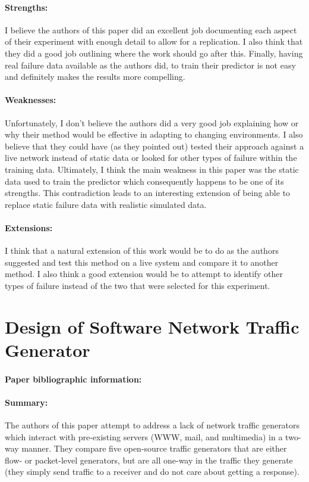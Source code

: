 \documentclass[11pt]{article}
\begin{document}
\paragraph{Strengths:}  I believe the authors of this paper did an excellent
job documenting each aspect of their experiment with enough detail to allow for
a replication.  I also think that they did a good job outlining where the work
should go after this.  Finally, having real failure data available as the
authors did, to train their predictor is not easy and definitely makes the
results more compelling.

\paragraph{Weaknesses:}  Unfortunately, I don't believe the authors did a very
good job explaining how or why their method would be effective in adapting to
changing environments.  I also believe that they could have (as they pointed
out) tested their approach against a live network instead of static data or
looked for other types of failure within the training data.  Ultimately, I
think the main weakness in this paper was the static data used to train the
predictor which consequently happens to be one of its strengths.  This
contradiction leads to an interesting extension of being able to replace static
failure data with realistic simulated data.

\paragraph{Extensions:}  I think that a natural extension of this work would be
to do as the authors suggested and test this method on a live system and
compare it to another method.  I also think a good extension would be to
attempt to identify other types of failure instead of the two that were
selected for this experiment.

\newpage
\section{Design of Software Network Traffic Generator}
\paragraph{Paper bibliographic information:}
\paragraph{Summary:}  The authors of this paper attempt to address a lack of network traffic generators which interact with pre-existing servers (WWW, mail, and multimedia) in a two-way manner.  They compare five open-source traffic generators that are either flow- or packet-level generators, but are all one-way in the traffic they generate (they simply send traffic to a receiver and do not care about getting a response).\\ 
\end{document}
